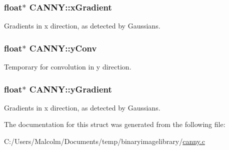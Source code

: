 \subsubsection[{\texorpdfstring{x\+Gradient}{xGradient}}]{\setlength{\rightskip}{0pt plus 5cm}float$\ast$ C\+A\+N\+N\+Y\+::x\+Gradient}\hypertarget{struct_c_a_n_n_y_acee34f5b2a2efb10a047710f07532514}{}\label{struct_c_a_n_n_y_acee34f5b2a2efb10a047710f07532514}
Gradients in x direction, as detected by Gaussians. 
\subsubsection[{\texorpdfstring{y\+Conv}{yConv}}]{\setlength{\rightskip}{0pt plus 5cm}float$\ast$ C\+A\+N\+N\+Y\+::y\+Conv}\hypertarget{struct_c_a_n_n_y_af0b4307fa9ac5d44278e60c68ac21a73}{}\label{struct_c_a_n_n_y_af0b4307fa9ac5d44278e60c68ac21a73}
Temporary for convolution in y direction. 
\subsubsection[{\texorpdfstring{y\+Gradient}{yGradient}}]{\setlength{\rightskip}{0pt plus 5cm}float$\ast$ C\+A\+N\+N\+Y\+::y\+Gradient}\hypertarget{struct_c_a_n_n_y_a26bbd60c2cdefea2ddead831d6041190}{}\label{struct_c_a_n_n_y_a26bbd60c2cdefea2ddead831d6041190}
Gradients in x direction, as detected by Gaussians. 

The documentation for this struct was generated from the following file\+:\begin{DoxyCompactItemize}
\item 
C\+:/\+Users/\+Malcolm/\+Documents/temp/binaryimagelibrary/\hyperlink{canny_8c}{canny.\+c}\end{DoxyCompactItemize}

